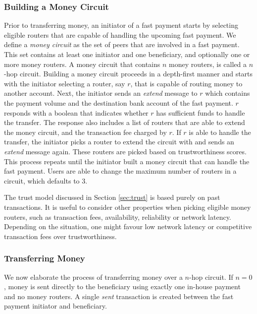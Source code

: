 \subsubsection*{Building a Money Circuit}
Prior to transferring money, an initiator of a fast payment starts by selecting eligible routers that are capable of handling the upcoming fast payment.
We define a \emph{money circuit} as the set of peers that are involved in a fast payment.
This set contains at least one initiator and one beneficiary, and optionally one or more money routers.
A money circuit that contains $ n $ money routers, is called a $n$-hop circuit.
Building a money circuit proceeds in a depth-first manner and starts with the initiator selecting a router, say $ r $, that is capable of routing money to another account.
Next, the initiator sends an \emph{extend} message to $ r $ which contains the payment volume and the destination bank account of the fast payment.
$ r $ responds with a boolean that indicates whether $ r $ has sufficient funds to handle the transfer.
The response also includes a list of routers that are able to extend the money circuit, and the transaction fee charged by $ r $.
If $ r $ is able to handle the transfer, the initiator picks a router to extend the circuit with and sends an \emph{extend} message again.
These routers are picked based on trustworthiness scores.
This process repeats until the initiator built a money circuit that can handle the fast payment. %
Users are able to change the maximum number of routers in a circuit, which defaults to 3.

The trust model discussed in Section \ref{sec:trust} is based purely on past transactions.
It is useful to consider other properties when picking eligible money routers, such as transaction fees, availability, reliability or network latency. 
Depending on the situation, one might favour low network latency or competitive transaction fees over trustworthiness.


\subsubsection*{Transferring Money}
We now elaborate the process of transferring money over a $ n $-hop circuit.
If $ n = 0 $, money is sent directly to the beneficiary using exactly one in-house payment and no money routers.
A single \emph{sent} transaction is created between the fast payment initiator and beneficiary.

